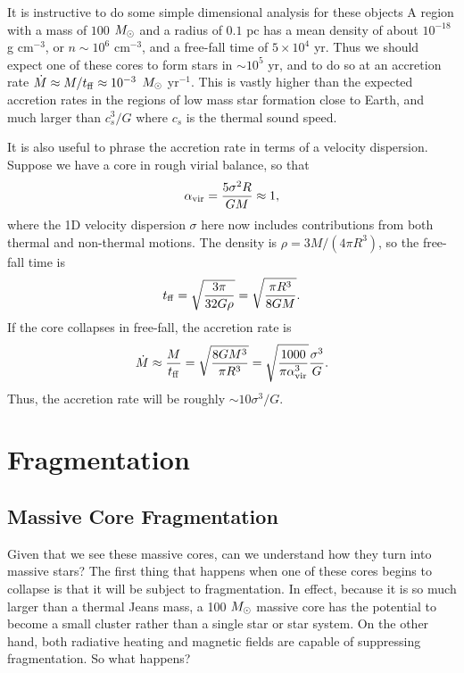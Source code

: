 It is instructive to do some simple dimensional analysis for these objects A region with a mass of $100$ $M_{\odot}$ and a radius of $0.1$ pc has a mean density of about $10^{-18}$ g cm$^{-3}$, or $n\sim 10^6$ cm$^{-3}$, and a free-fall time of $5\times 10^4$ yr. Thus we should expect one of these cores to form stars in $\sim 10^5$ yr, and to do so at an accretion rate $\dot{M}\approx M/t_{\rm ff} \approx 10^{-3}$ $M_{\odot}$ yr$^{-1}$. This is vastly higher than the expected accretion rates in the regions of low mass star formation close to Earth, and much larger than $c_s^3/G$ where $c_s$ is the thermal sound speed. 

It is also useful to phrase the accretion rate in terms of a velocity dispersion. Suppose we have a core in rough virial balance, so that
\begin{equation}
\alpha_{\rm vir} = \frac{5 \sigma^2 R}{G M} \approx 1,
\end{equation}
where the 1D velocity dispersion $\sigma$ here now includes contributions from both thermal and non-thermal motions. The density is $\rho=3 M/(4\pi R^3)$, so the free-fall time is
\begin{equation}
t_{\rm ff} = \sqrt{\frac{3\pi}{32 G \rho}} = \sqrt{\frac{\pi R^3}{8 G M}}.
\end{equation}
If the core collapses in free-fall, the accretion rate is
\begin{equation}
\dot{M} \approx \frac{M}{t_{\rm ff}} = \sqrt{\frac{8 G M^3}{\pi R^3}} = \sqrt{\frac{1000}{\pi\alpha_{\rm vir}^3}} \frac{\sigma^3}{G}.
\end{equation}
Thus, the accretion rate will be roughly $\sim 10 \sigma^3/G$.

\section{Fragmentation}

\subsection{Massive Core Fragmentation}

Given that we see these massive cores, can we understand how they turn into massive stars? The first thing that happens when one of these cores begins to collapse is that it will be subject to fragmentation. In effect, because it is so much larger than a thermal Jeans mass, a 100 $M_{\odot}$ massive core has the potential to become a small cluster rather than a single star or star system. On the other hand, both radiative heating and magnetic fields are capable of suppressing fragmentation. So what happens?

